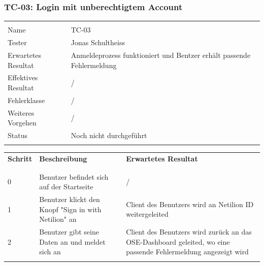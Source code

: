 \subsubsection{TC-03: Login mit unberechtigtem Account}
\begin{table}[H]
  \begin{tabularx}{\textwidth}{l X}\hline \\
  Name & TC-03 \\
  Tester & Jonas Schultheiss \\
  Erwartetes Resultat & Anmeldeprozess funktioniert und Bentzer erhält passende Fehlermeldung \\
  Effektives Resultat & / \\
  Fehlerklasse & / \\
  Weiteres Vorgehen & / \\
  Status & Noch nicht durchgeführt \\
  \\\hline
  \end{tabularx}
\end{table}
\begin{table}[H]
  \begin{tabularx}{\textwidth}{l X X}
  \textbf{Schritt} & \textbf{Beschreibung} & \textbf{Erwartetes Resultat}\\ \\\hline \\
  0 & Benutzer befindet sich auf der Startseite & / \\
  1 & Benutzer klickt den Knopf "Sign in with Netilion" an & Client des Benutzers wird an Netilion ID weitergeleited \\
  2 & Benutzer gibt seine Daten an und meldet sich an & Client des Benutzers wird zurück an das OSE-Dashboard geleited, wo eine passende Fehlermeldung angezeigt wird \\
  \\\hline
  \end{tabularx}
\end{table}
\pagebreak

